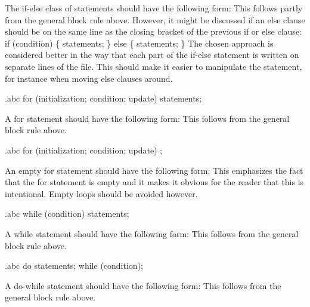\recommendation
{The if-else class of statements should have the following form:}
{}
{
	This follows partly from the general block rule above. However, it might be discussed if an else clause should be on the same line as the closing bracket of the previous if or else clause:\newline
	if (condition) \{\newline
		statements;\newline
	\} else \{\newline
		statements;\newline
	\}\newline
	The chosen approach is considered better in the way that each part of the if-else statement is written on separate lines of the file. This should make it easier to manipulate the statement, for instance when moving else clauses around.
}


\begin{filecontents*}{\jobname.abc}
	for (initialization; condition; update) {
	    statements;
	}
\end{filecontents*}

\recommendation
{A for statement should have the following form:}
{}
{This follows from the general block rule above.}


\begin{filecontents*}{\jobname.abc}
	for (initialization; condition; update)
	    ;
\end{filecontents*}

\recommendation
{An empty for statement should have the following form:}
{}
{This emphasizes the fact that the for statement is empty and it makes it obvious for the reader that this is intentional. Empty loops should be avoided however.}


\begin{filecontents*}{\jobname.abc}
	while (condition) {
	    statements;
	}
\end{filecontents*}

\recommendation
{A while statement should have the following form:}
{}
{This follows from the general block rule above.}


\begin{filecontents*}{\jobname.abc}
	do {
	    statements;
	} while (condition);
\end{filecontents*}

\recommendation
{A do-while statement should have the following form:}
{}
{This follows from the general block rule above.}


